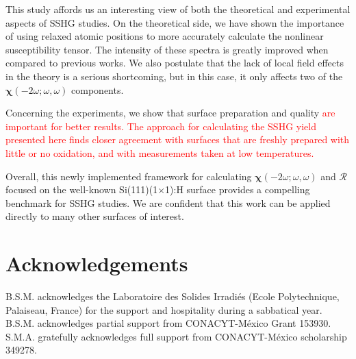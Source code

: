 \documentclass[prb,superscriptaddress,showpacs,twocolumn,letterpaper]{revtex4}
\newcommand{\change}[1]{\textcolor{red}{#1}}
\begin{document}
This study affords us an interesting view of both the theoretical and
experimental aspects of SSHG studies. On the theoretical side, we have shown the
importance of using relaxed atomic positions to more accurately calculate the
nonlinear susceptibility tensor. The intensity of these spectra is greatly
improved when compared to previous works.\cite{mejiaPRB02} We also postulate
that the lack of local field effects in the theory is a serious shortcoming, but
in this case, it only affects two of the
$\boldsymbol{\chi}(-2\omega;\omega,\omega)$ components.

Concerning the experiments, we show that surface preparation and quality
\change{are important for better results. The approach for calculating the SSHG
yield presented here finds closer agreement with surfaces that are freshly
prepared with little or no oxidation, and with measurements taken at low
temperatures. } %

Overall, this newly implemented framework for calculating
$\boldsymbol{\chi}(-2\omega;\omega,\omega)$ and $\mathcal{R}$ focused on the
well-known Si(111)(1$\times$1):H surface provides a compelling benchmark for
SSHG studies. We are confident that this work can be applied directly to many
other surfaces of interest.


\section{Acknowledgements}\label{sec:acknowledgements}

B.S.M. acknowledges the Laboratoire des Solides Irradi\'es (Ecole Polytechnique,
Palaiseau, France) for the support and hospitality during a sabbatical year.
B.S.M. acknowledges partial support from CONACYT-M\'exico Grant 153930. S.M.A.
gratefully acknowledges full support from CONACYT-M\'exico scholarship 349278.



\end{document}
